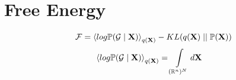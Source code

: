 \documentclass[12pt]{report}
\newcommand{\mc}[1]{\mathcal{#1}}
\newcommand{\mb}[1]{\mathbb{#1}}
\begin{document}
\chapter{Free Energy}
\begin{equation}
    \mc{F} = \left<log\mb{P}(\mc{G}\mid \bf{X})\right>_{q(\bf{X})} - KL(q(\bf{X}) \mid\mid \mb{P}(\bf{X}))
\end{equation}
\begin{align*}
    \left<log\mb{P}(\mc{G}\mid \bf{X})\right>_{q(\bf{X})} &= \int\limits_{(\mb{R}^n)^N} d\bf{X}
\end{align*}
\end{document}
